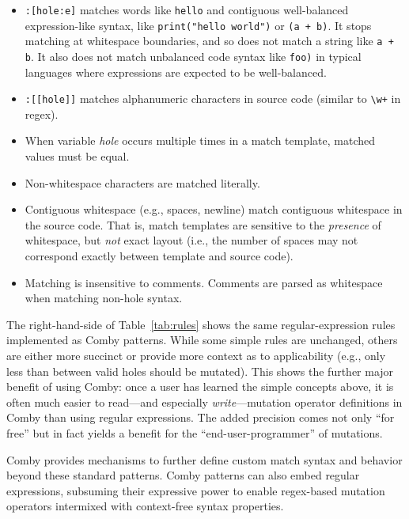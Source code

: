 \documentclass[acmsmall,screen,review,anonymous]{acmart}
\begin{document}
{\begin{itemize}
\item \texttt{\small:[hole:e]} matches words like \texttt{\small hello} and contiguous well-balanced expression-like syntax, like \texttt{\small print("hello world")} or \texttt{\small (a + b)}. It stops matching at whitespace boundaries, and so does not match a string like \texttt{\small a + b}. It also does not match unbalanced code syntax like \texttt{\small foo)} in typical languages where expressions are expected to be well-balanced.

\item \texttt{\small :[[hole]]} matches alphanumeric characters in source code (similar to \texttt{\small\textbackslash w+} in regex).

\item When variable \emph{hole} occurs multiple times in a match
  template, matched values must be equal.

\item Non-whitespace characters are matched literally.

\item Contiguous whitespace (e.g., spaces, newline) match contiguous whitespace in the source code. That is, match templates are sensitive to the \emph{presence} of whitespace, but \emph{not} exact layout (i.e., the number of spaces may not correspond exactly between template and source code).

\item Matching is insensitive to comments. Comments are parsed as whitespace when matching non-hole syntax.

\end{itemize}

The right-hand-side of Table~\ref{tab:rules} shows the same regular-expression rules 
implemented as Comby patterns.  While some simple rules are
unchanged, others are either more succinct or provide more context as
to applicability (e.g., only less than between valid holes should be
mutated).  This shows the
further major benefit of using Comby: once a user has learned
the simple concepts above, it is often much easier to read---and
especially \emph{write}---mutation
operator definitions in Comby than using regular expressions.  The
added precision comes not only ``for free'' but in fact yields a
benefit for the ``end-user-programmer'' of mutations.

Comby provides mechanisms to further define custom match syntax and behavior
beyond these standard patterns. Comby patterns can also embed regular expressions, subsuming their
expressive power to enable regex-based mutation operators intermixed with
context-free syntax
properties.



}
\end{document}
